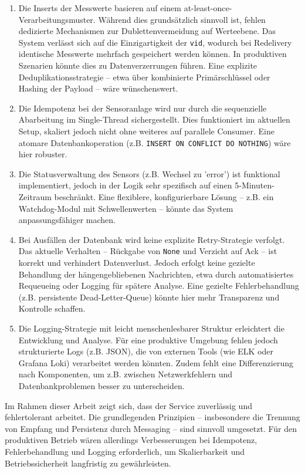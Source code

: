 \begin{enumerate}
    \item Die Inserts der Messwerte basieren auf einem at-least-once-Verarbeitungsmuster. Während dies grundsätzlich sinnvoll ist, fehlen dedizierte Mechanismen zur Dublettenvermeidung auf Werteebene. Das System verlässt sich auf die Einzigartigkeit der \texttt{vid}, wodurch bei Redelivery identische Messwerte mehrfach gespeichert werden können. In produktiven Szenarien könnte dies zu Datenverzerrungen führen. Eine explizite Deduplikationsstrategie – etwa über kombinierte Primärschlüssel oder Hashing der Payload – wäre wünschenswert.
    \item Die Idempotenz bei der Sensoranlage wird nur durch die sequenzielle Abarbeitung im Single-Thread sichergestellt. Dies funktioniert im aktuellen Setup, skaliert jedoch nicht ohne weiteres auf parallele Consumer. Eine atomare Datenbankoperation (z.B. \texttt{INSERT ON CONFLICT DO NOTHING}) wäre hier robuster.
    \item Die Statusverwaltung des Sensors (z.B. Wechsel zu 'error') ist funktional implementiert, jedoch in der Logik sehr spezifisch auf einen 5-Minuten-Zeitraum beschränkt. Eine flexiblere, konfigurierbare Lösung – z.B. ein Watchdog-Modul mit Schwellenwerten – könnte das System anpassungsfähiger machen.
    \item Bei Ausfällen der Datenbank wird keine explizite Retry-Strategie verfolgt. Das aktuelle Verhalten – Rückgabe von \texttt{None} und Verzicht auf Ack – ist korrekt und verhindert Datenverlust. Jedoch erfolgt keine gezielte Behandlung der hängengebliebenen Nachrichten, etwa durch automatisiertes Requeueing oder Logging für spätere Analyse. Eine gezielte Fehlerbehandlung (z.B. persistente Dead-Letter-Queue) könnte hier mehr Transparenz und Kontrolle schaffen.
    \item Die Logging-Strategie mit leicht menschenlesbarer Struktur erleichtert die Entwicklung und Analyse. Für eine produktive Umgebung fehlen jedoch strukturierte Logs (z.B. JSON), die von externen Tools (wie ELK oder Grafana Loki) verarbeitet werden könnten. Zudem fehlt eine Differenzierung nach Komponenten, um z.B. zwischen Netzwerkfehlern und Datenbankproblemen besser zu unterscheiden.
\end{enumerate}

Im Rahmen dieser Arbeit zeigt sich, dass der Service zuverlässig und fehlertolerant arbeitet. Die grundlegenden Prinzipien – insbesondere die Trennung von Empfang und Persistenz durch Messaging – sind sinnvoll umgesetzt. Für den produktiven Betrieb wären allerdings Verbesserungen bei Idempotenz, Fehlerbehandlung und Logging erforderlich, um Skalierbarkeit und Betriebssicherheit langfristig zu gewährleisten.


